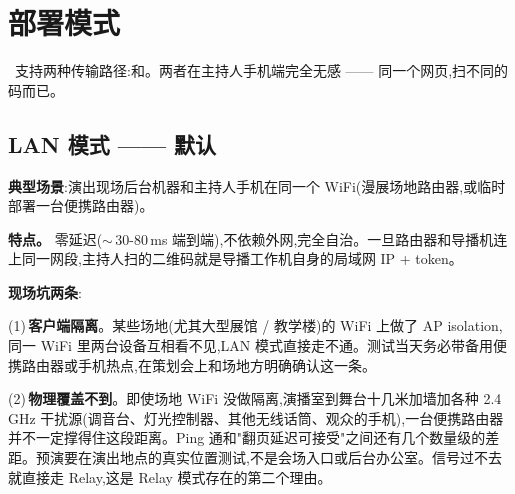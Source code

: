 \section{部署模式}

\app\ 支持两种传输路径:和。两者在主持人手机端完全无感 —— 同一个网页,扫不同的码而已。

\subsection{LAN 模式 —— 默认}

\textbf{典型场景}:演出现场后台机器和主持人手机在同一个 WiFi(漫展场地路由器,或临时部署一台便携路由器)。

\begin{center}
\end{center}

\textbf{特点。} 零延迟($\sim$\,30-80\,ms 端到端),不依赖外网,完全自治。一旦路由器和导播机连上同一网段,主持人扫的二维码就是导播工作机自身的局域网 IP + token。

\begin{warnbox}
\textbf{现场坑两条}:

(1)\,\textbf{客户端隔离}。某些场地(尤其大型展馆 / 教学楼)的 WiFi 上做了 AP isolation,同一 WiFi 里两台设备互相看不见,LAN 模式直接走不通。测试当天务必带备用便携路由器或手机热点,在策划会上和场地方明确确认这一条。

(2)\,\textbf{物理覆盖不到}。即使场地 WiFi 没做隔离,演播室到舞台十几米加墙加各种 2.4 GHz 干扰源(调音台、灯光控制器、其他无线话筒、观众的手机),一台便携路由器并不一定撑得住这段距离。Ping 通和"翻页延迟可接受"之间还有几个数量级的差距。预演要在演出地点的真实位置测试,不是会场入口或后台办公室。信号过不去就直接走 Relay,这是 Relay 模式存在的第二个理由。
\end{warnbox}

